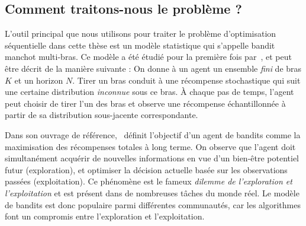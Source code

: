 
\subsection{Comment traitons-nous le probl\`eme ?}\label{sec:abs.context.how}

L'outil principal que nous utilisons pour traiter le problème d'optimisation séquentielle dans cette thèse est un modèle statistique qui s'appelle bandit manchot multi-bras. Ce modèle a été étudié pour la première fois par~\cite{thompson1933}, et peut être décrit de la manière suivante : On donne à un agent un ensemble \emph{fini} de bras $K$ et un horizon $N$. Tirer un bras conduit à une récompense stochastique qui suit une certaine distribution \emph{inconnue} sous ce bras. À chaque pas de temps, l'agent peut choisir de tirer l'un des bras et observe une récompense échantillonnée à partir de sa distribution sous-jacente correspondante.


Dans son ouvrage de référence,~\cite{robbins1952} définit l'objectif d'un agent de bandits comme la maximisation des récompenses totales à long terme. On observe que l'agent doit simultanément acquérir de nouvelles informations en vue d'un bien-être potentiel futur (exploration), et optimiser la décision actuelle basée sur les observations passées (exploitation). Ce phénomène est le fameux \emph{dilemme de l'exploration et l'exploitation} et est présent dans de nombreuses tâches du monde réel. Le modèle de bandits est donc populaire parmi différentes communautés, car les algorithmes font un compromis entre l'exploration et l'exploitation.

